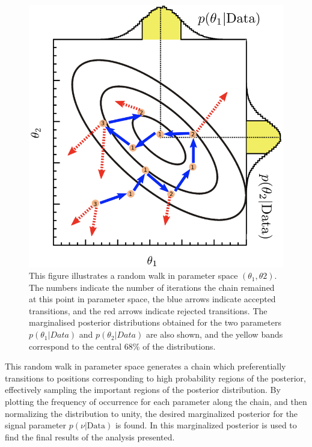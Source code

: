 \begin{figure}[!htbp]
\centering
\includegraphics[width=0.7\linewidth]{figures/fit/markov_chain}
\caption{\cite{Beresford:2642397}This figure illustrates a random walk in parameter space $(\theta_{1},\theta{2})$. The numbers indicate the number of iterations the chain remained at this point in parameter space, the blue arrows indicate accepted transitions, and the red arrows indicate rejected transitions. The marginalised posterior distributions obtained for the two parameters $p(\theta_{1}|Data)$ and $p(\theta_{2}|Data)$ are also shown, and the yellow bands correspond to the central 68\% of the distributions.}
\label{sec:fit:markov_chain}
\end{figure}

This random walk in parameter space generates a chain which preferentially
transitions to positions corresponding to high probability regions of the
posterior, effectively sampling the important regions of the posterior
distribution.  By plotting the frequency of occurrence for each parameter along
the chain, and then normalizing the distribution to unity, the desired
marginalized posterior for the signal parameter $p(\nu|\text{Data})$ is found.
In  this marginalized posterior is used to find the final
results of the analysis presented.
